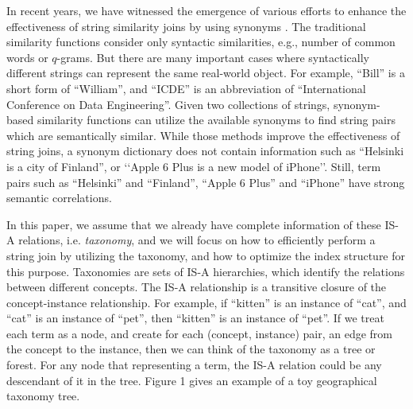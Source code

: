 
In recent years, we have witnessed the emergence of various efforts to enhance the effectiveness of string similarity joins by using synonyms \cite{conf/sigmod/LuLWLW13,conf/icde/ArasuCK08,conf/cpm/BarbayGMR06,conf/vldb/ArvindSR09}.
The traditional similarity functions consider only syntactic similarities, e.g., number of common
words or $q$-grams. But there are many important cases where syntactically different
strings can represent the same real-world object. For example,
``\textsf{Bill}'' is a short form of ``\textsf{William}'', and ``\textsf{ICDE}'' is an abbreviation of  ``\textsf{International Conference on Data Engineering}''.  Given two collections of strings,  synonym-based similarity functions can utilize the available synonyms to find string pairs which are semantically similar. While those methods improve the effectiveness of string joins, a synonym dictionary does not contain information such as
``\textsf{Helsinki is a city of Finland}'', or `\textsf{`Apple 6 Plus is a new model of iPhone}''. Still, term pairs such as ``\textsf{Helsinki}'' and ``\textsf{Finland}'', ``\textsf{Apple 6 Plus}'' and ``\textsf{iPhone}''  have strong semantic correlations.


In this paper, we assume that we already have complete
information of these IS-A relations, i.e. \textit{taxonomy}, and we will focus on how
to efficiently perform a string join by utilizing the taxonomy, and how to optimize the index structure
for this purpose.  Taxonomies are sets of IS-A hierarchies, which identify the relations between different concepts. The IS-A relationship
is a transitive closure of the concept-instance relationship.
For example, if ``\textsf{kitten}'' is an instance of ``\textsf{cat}'', and
``\textsf{cat}'' is an instance of ``\textsf{pet}'', then ``\textsf{kitten}'' is an instance
of ``\textsf{pet}''. If we treat each term as a node, and create
for each (concept, instance) pair, an edge from the concept
to the instance, then we can think of the taxonomy as a tree or forest. For any node that representing a term,
the IS-A relation could be any descendant of it in the tree. Figure
1 gives an example of a toy geographical taxonomy tree.


